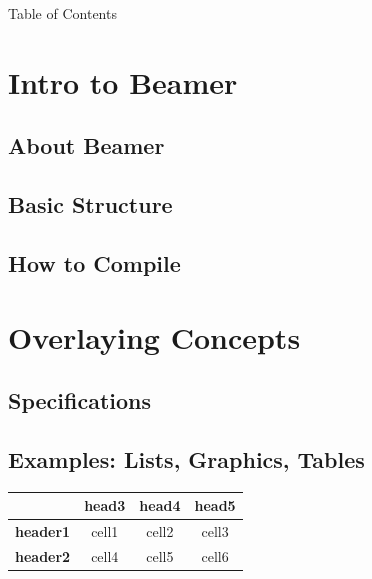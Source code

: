 \documentclass{beamer}
\begin{document}
\begin{frame}
    {Table of Contents}
    \tableofcontents[pausesections] %
\end{frame}

\section{Intro to Beamer}
\subsection{About Beamer}
\subsection[Basic Structure]{Basic Structure}
\subsection{How to Compile}


\section{Overlaying Concepts}
\subsection{Specifications}
\subsection[Examples]{Examples: Lists, Graphics, Tables}
\begin{frame}
    \begin{table}
        \begin{tabular}{l|ccc}
            \toprule
            & \textbf{head3} & \textbf{head4} & \textbf{head5} \\
            \midrule
            \textbf{header1} & cell1 & cell2 & cell3 \\ 
            \midrule
            \textbf{header2} & cell4 & cell5 & cell6 \\ 
            \bottomrule
        \end{tabular}
    \end{table}
\end{frame}
\end{document}
